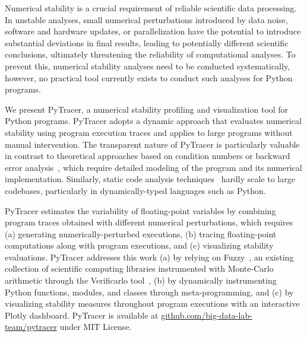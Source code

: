 \documentclass[10pt,journal,compsoc]{IEEEtran}
\newcommand{\pytracer}[0]{PyTracer\xspace}
\DeclareRobustCommand{\add}[1]{\textcolor{ao(english)}{#1}}%
\DeclareRobustCommand{\remove}[1]{}
\DeclareRobustCommand{\add}[1]{#1}
\DeclareRobustCommand{\remove}[1]{}
\begin{document}
Numerical stability is a crucial requirement of reliable scientific data
processing. In unstable analyses, small numerical perturbations introduced by
data noise, software and hardware updates, or parallelization have the potential to
introduce substantial deviations in final results, leading to potentially
different scientific conclusions, ultimately threatening the reliability of
computational analyses. To prevent this, numerical stability analyses need to be
conducted systematically, however, no practical tool currently exists to conduct
such analyses for Python programs.

We present PyTracer, a numerical stability profiling and visualization tool for
Python programs. \pytracer adopts a dynamic approach that evaluates numerical
stability using program execution traces and applies to large programs
without manual intervention. The transparent nature of \pytracer is particularly
valuable in contrast to theoretical approaches based on condition numbers or
backward error analysis~\cite{higham2002accuracy}, which require
detailed modeling of the program and its numerical implementation. Similarly,
static code analysis techniques~\cite{goubault2006static} hardly scale
to large codebases, particularly in dynamically-typed languages such as Python.

\pytracer estimates the variability of floating-point variables by
combining program traces obtained with different numerical perturbations,
which requires (\add{a}\remove{1}) generating numerically-perturbed
executions, (\add{b}\remove{2}) tracing floating-point computations along with
program executions, and (\add{c}\remove{3}) visualizing stability
evaluations. \add{PyTracer addresses this work (a) by relying on
    Fuzzy~\cite{kiar2020comparing}, an existing collection of scientific
    computing libraries instrumented with Monte-Carlo arithmetic through the
    Verificarlo tool~\cite{verificarlo}, (b) by dynamically instrumenting
    Python functions, modules, and classes through meta-programming, and (c) by
    visualizing stability measures throughout program executions with an
    interactive Plotly dashboard. \mbox{\pytracer} is available at
    \mbox{\href{https://github.com/big-data-lab-team/pytracer}{github.com/big-data-lab-team/pytracer}}
    under MIT License.} \remove{\mbox{\pytracer} addresses these requirements
    with (1) a Fuzzy Python interpreter instrumented with Monte-Carlo
    arithmetic, (2) a dynamic instrumentation of Python functions, modules, and
    classes through meta-programming, (3) an interactive Plotly dashboard to
    visualize stability measures throughout program executions. }
\end{document}
